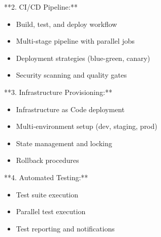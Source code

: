 \documentclass[11pt,a4paper]{article}
\begin{document}
**2. CI/CD Pipeline:**

\begin{itemize}
\item Build, test, and deploy workflow
\end{itemize}

\begin{itemize}
\item Multi-stage pipeline with parallel jobs
\end{itemize}

\begin{itemize}
\item Deployment strategies (blue-green, canary)
\end{itemize}

\begin{itemize}
\item Security scanning and quality gates
\end{itemize}

**3. Infrastructure Provisioning:**

\begin{itemize}
\item Infrastructure as Code deployment
\end{itemize}

\begin{itemize}
\item Multi-environment setup (dev, staging, prod)
\end{itemize}

\begin{itemize}
\item State management and locking
\end{itemize}

\begin{itemize}
\item Rollback procedures
\end{itemize}

**4. Automated Testing:**

\begin{itemize}
\item Test suite execution
\end{itemize}

\begin{itemize}
\item Parallel test execution
\end{itemize}

\begin{itemize}
\item Test reporting and notifications
\end{itemize}
\end{document}
